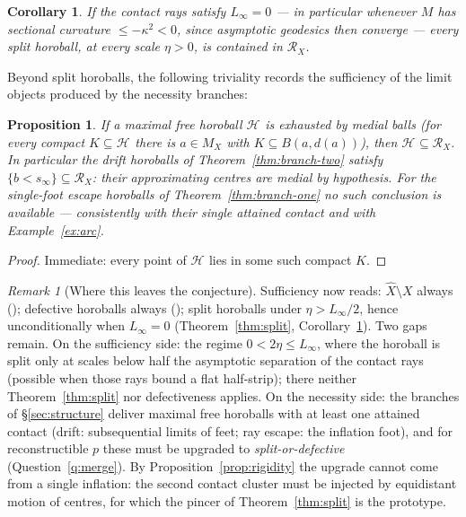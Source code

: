 \documentclass[11pt]{article}
\newtheorem{proposition}[theorem]{Proposition}
\newtheorem{corollary}[theorem]{Corollary}
\theoremstyle{remark}
\newtheorem{remark}[theorem]{Remark}
\newcommand{\X}{X}
\newcommand{\Xhat}{\widehat{\X}}
\newcommand{\Mx}{M_{\X}}
\newcommand{\Rx}{\mathcal{R}_{\X}}
\newcommand{\Hb}[1]{\mathcal{H}_{#1}}
\newcommand{\B}{B}
\begin{document}
\begin{corollary}\label{cor:pinched}
If the contact rays satisfy $L_{\infty}=0$ --- in particular whenever
$M$ has sectional curvature $\le-\kappa^{2}<0$, since asymptotic
geodesics then converge --- every split horoball, at every scale
$\eta>0$, is contained in $\Rx$.
\end{corollary}

Beyond split horoballs, the following triviality records the
sufficiency of the limit objects produced by the necessity branches:

\begin{proposition}\label{prop:medial-horoball}
If a maximal free horoball $\Hb{}$ is exhausted by medial balls
(for every compact $K\subseteq\Hb{}$ there is $a\in\Mx$ with
$K\subseteq\B(a,d(a))$), then $\Hb{}\subseteq\Rx$. In particular the
drift horoballs of Theorem~\ref{thm:branch-two} satisfy
$\{b<s_{\infty}\}\subseteq\Rx$: their approximating centres are
medial by hypothesis. For the single-foot escape horoballs of
Theorem~\ref{thm:branch-one} no such conclusion is available ---
consistently with their single attained contact and with
Example~\ref{ex:arc}.
\end{proposition}

\begin{proof}
Immediate: every point of $\Hb{}$ lies in some such compact $K$.
\end{proof}

\begin{remark}[Where this leaves the conjecture]\label{rem:leaves}
Sufficiency now reads: $\Xhat\setminus\X$ always
(\cite[Thm.~3.1]{R1}); defective horoballs always
(\cite[Thm.~4.1]{R1}); split horoballs under
$\eta>L_{\infty}/2$, hence unconditionally when $L_{\infty}=0$
(Theorem~\ref{thm:split}, Corollary~\ref{cor:pinched}). Two gaps
remain. On the sufficiency side: the regime
$0<2\eta\le L_{\infty}$, where the horoball is split only at scales
below half the asymptotic separation of the contact rays (possible
when those rays bound a flat half-strip); there neither
Theorem~\ref{thm:split} nor defectiveness applies. On the necessity
side: the branches of \S\ref{sec:structure} deliver maximal free
horoballs with at least one attained contact (drift: subsequential
limits of feet; ray escape: the inflation foot), and for
reconstructible $p$ these must be upgraded to
\emph{split-or-defective} (Question~\ref{q:merge}). By
Proposition~\ref{prop:rigidity} the upgrade cannot come from a single
inflation: the second contact cluster must be injected by equidistant
motion of centres, for which the pincer of Theorem~\ref{thm:split} is
the prototype.
\end{remark}
\end{document}
